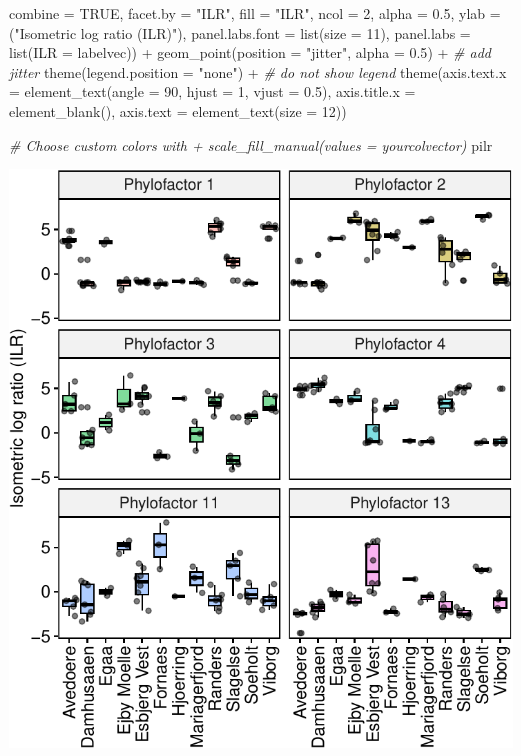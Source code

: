 \documentclass[
]{book}
\newenvironment{Shaded}{\begin{snugshade}}{\end{snugshade}}
\newcommand{\AttributeTok}[1]{\textcolor[rgb]{0.77,0.63,0.00}{#1}}
\newcommand{\CommentTok}[1]{\textcolor[rgb]{0.56,0.35,0.01}{\textit{#1}}}
\newcommand{\ConstantTok}[1]{\textcolor[rgb]{0.00,0.00,0.00}{#1}}
\newcommand{\DecValTok}[1]{\textcolor[rgb]{0.00,0.00,0.81}{#1}}
\newcommand{\FloatTok}[1]{\textcolor[rgb]{0.00,0.00,0.81}{#1}}
\newcommand{\FunctionTok}[1]{\textcolor[rgb]{0.00,0.00,0.00}{#1}}
\newcommand{\NormalTok}[1]{#1}
\newcommand{\SpecialCharTok}[1]{\textcolor[rgb]{0.00,0.00,0.00}{#1}}
\newcommand{\StringTok}[1]{\textcolor[rgb]{0.31,0.60,0.02}{#1}}
\begin{document}
\begin{Shaded}
\begin{Highlighting}[]
    \AttributeTok{combine =} \ConstantTok{TRUE}\NormalTok{, }
    \AttributeTok{facet.by =} \StringTok{"ILR"}\NormalTok{, }
    \AttributeTok{fill =} \StringTok{"ILR"}\NormalTok{, }
    \AttributeTok{ncol =} \DecValTok{2}\NormalTok{, }
    \AttributeTok{alpha =} \FloatTok{0.5}\NormalTok{, }
    \AttributeTok{ylab =}\NormalTok{ (}\StringTok{"Isometric log ratio (ILR)"}\NormalTok{), }
    \AttributeTok{panel.labs.font =} \FunctionTok{list}\NormalTok{(}\AttributeTok{size =} \DecValTok{11}\NormalTok{), }
    \AttributeTok{panel.labs =} \FunctionTok{list}\NormalTok{(}\AttributeTok{ILR =}\NormalTok{ labelvec)) }\SpecialCharTok{+} 
    \FunctionTok{geom\_point}\NormalTok{(}\AttributeTok{position =} \StringTok{"jitter"}\NormalTok{, }\AttributeTok{alpha =} \FloatTok{0.5}\NormalTok{) }\SpecialCharTok{+}  \CommentTok{\# add jitter }
    \FunctionTok{theme}\NormalTok{(}\AttributeTok{legend.position =} \StringTok{"none"}\NormalTok{) }\SpecialCharTok{+}               \CommentTok{\# do not show legend}
    \FunctionTok{theme}\NormalTok{(}\AttributeTok{axis.text.x =} \FunctionTok{element\_text}\NormalTok{(}\AttributeTok{angle =} \DecValTok{90}\NormalTok{, }\AttributeTok{hjust =} \DecValTok{1}\NormalTok{, }
    \AttributeTok{vjust =} \FloatTok{0.5}\NormalTok{), }\AttributeTok{axis.title.x =} \FunctionTok{element\_blank}\NormalTok{(), }\AttributeTok{axis.text =} \FunctionTok{element\_text}\NormalTok{(}\AttributeTok{size =} \DecValTok{12}\NormalTok{))}

\CommentTok{\# Choose custom colors with + scale\_fill\_manual(values = yourcolvector)}
\NormalTok{pilr }
\end{Highlighting}
\end{Shaded}

\includegraphics{gitbook-demo_files/figure-latex/pfviz1-1.pdf}
\end{document}
